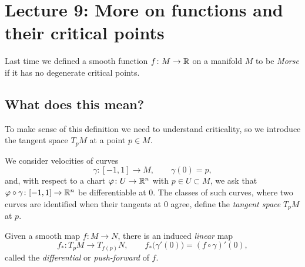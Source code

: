 \chapter{Lecture 9: More on functions and their critical points}
\label{L9:chap}

Last time we defined a smooth function $f\colon M\to\mathbb{R}$ on a manifold $M$ to be
\emph{Morse} if it has no degenerate critical points.%

\section{What does this mean?}
\label{L9:sec:meaning}

To make sense of this definition we need to understand criticality, so we introduce
the tangent space $T_pM$ at a point $p\in M$.

\begin{center}
\end{center}

We consider velocities of curves
\[
  \gamma\colon[-1,1]\to M,\qquad \gamma(0)=p,
\]
and, with respect to a chart $\varphi\colon U\to\mathbb{R}^n$ with $p\in U\subset M$, we ask
that $\varphi\circ\gamma\colon[-1,1]\to\mathbb{R}^n$ be differentiable at $0$.
The classes of such curves, where two curves are identified when their tangents
 at $0$ agree, define the \emph{tangent space} $T_pM$ at $p$.

Given a smooth map $f\colon M\to N$, there is an induced \emph{linear} map
\[
  f_*\colon T_pM\to T_{f(p)}N,\qquad f_*\bigl(\gamma'(0)\bigr)=(f\circ\gamma)'(0),
\]
called the \emph{differential} or \emph{push-forward} of $f$.

